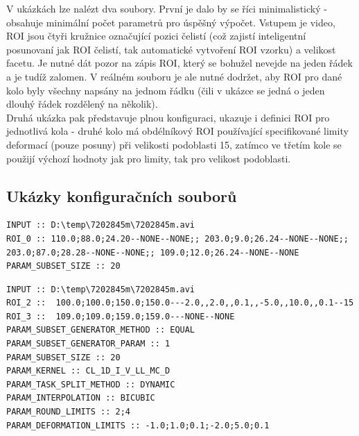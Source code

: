 \documentclass[a4paper,12pt]{article}
\begin{document}
V ukázkách lze nalézt dva soubory. První je dalo by se říci minimalistický - obsahuje minimální počet parametrů pro úspěšný výpočet. Vstupem je video, ROI jsou čtyři kružnice označující pozici čelistí (což zajistí inteligentní posunovaní jak ROI čelistí, tak automatické vytvoření ROI vzorku) a velikost facetu. Je nutné dát pozor na zápis ROI, který se bohužel nevejde na jeden řádek a je tudíž zalomen. V reálném souboru je ale nutné dodržet, aby ROI pro dané kolo byly všechny napsány na jednom řádku (čili v ukázce se jedná o jeden dlouhý řádek rozdělený na několik).\\
Druhá ukázka pak představuje plnou konfiguraci, ukazuje i definici ROI pro jednotlivá kola - druhé kolo má obdélníkový ROI používající specifikované limity deformací (pouze posuny) při velikosti podoblasti 15, zatímco ve třetím kole se použijí výchozí hodnoty jak pro limity, tak pro velikost podoblasti.
\newpage
\subsection{Ukázky konfiguračních souborů}
\label{sec:configExample}
\begin{lstlisting}[title=Jednoduchý konfigurační soubor pro automatický výpočet]
INPUT :: D:\temp\7202845m\7202845m.avi
ROI_0 :: 110.0;88.0;24.20--NONE--NONE;; 203.0;9.0;26.24--NONE--NONE;; 203.0;87.0;28.28--NONE--NONE;; 109.0;12.0;26.24--NONE--NONE
PARAM_SUBSET_SIZE :: 20
\end{lstlisting}
\begin{lstlisting}[title=Plný konfigurační soubor pro automatický výpočet]
INPUT :: D:\temp\7202845m\7202845m.avi
ROI_2 ::  100.0;100.0;150.0;150.0---2.0,,2.0,,0.1,,-5.0,,10.0,,0.1--15
ROI_3 ::  109.0;109.0;159.0;159.0---NONE--NONE
PARAM_SUBSET_GENERATOR_METHOD :: EQUAL
PARAM_SUBSET_GENERATOR_PARAM :: 1
PARAM_SUBSET_SIZE :: 20
PARAM_KERNEL :: CL_1D_I_V_LL_MC_D
PARAM_TASK_SPLIT_METHOD :: DYNAMIC
PARAM_INTERPOLATION :: BICUBIC
PARAM_ROUND_LIMITS :: 2;4
PARAM_DEFORMATION_LIMITS :: -1.0;1.0;0.1;-2.0;5.0;0.1
\end{lstlisting}
\end{document}
